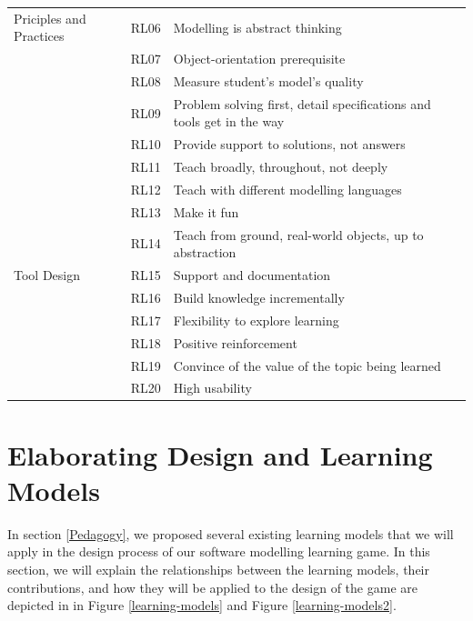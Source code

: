 \documentclass[12pt, a4paper]{report}
\begin{document}
{\begin{table}[ht]
\begin{center}
\begin{tabular}{ p{2cm}p{1cm}p{10cm} }
\hline
\multirow{1}{2cm}{Priciples and Practices} 
& RL06 & Modelling is abstract thinking \\ 
& RL07 & Object-orientation prerequisite \\
& RL08 & Measure student's model's quality \\
& RL09 & Problem solving first, detail specifications and tools get in the way \\
& RL10 & Provide support to solutions, not answers \\ 
& RL11 & Teach broadly, throughout, not deeply \\
& RL12 & Teach with different modelling languages \\ 
& RL13 & Make it fun \\ 
& RL14 & Teach from ground, real-world objects, up to abstraction \\ 

\hline
\multirow{1}{2cm}{Tool Design}
& RL15 & Support and documentation \\
& RL16 & Build knowledge incrementally \\
& RL17 & Flexibility to explore learning \\
& RL18 & Positive reinforcement \\
& RL19 & Convince of the value of the topic being learned \\ 
& RL20 & High usability \\ 
\hline
\end{tabular}
\end{center}
\end{table}

\section{Elaborating Design and Learning Models}
\label{Elaborating Design and Learning Models}
In section \ref{Pedagogy}, we proposed several existing learning models that we will apply in the design process of our software modelling learning game. In this section, we will explain the relationships between the learning models, their contributions, and how they will be applied to the design of the game are depicted in in Figure \ref{learning-models} and Figure \ref{learning-models2}.

}
\end{document}
